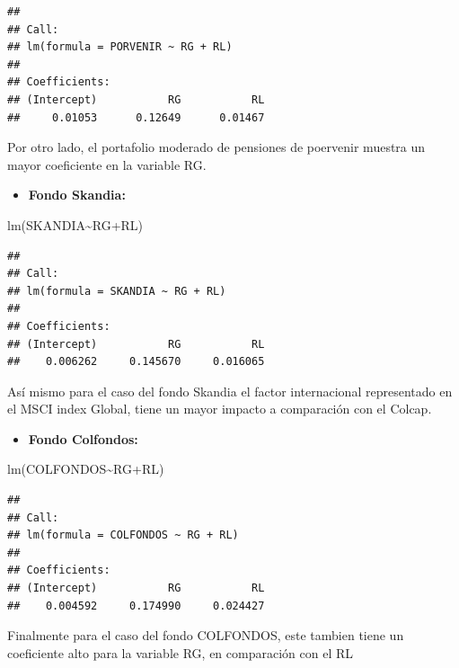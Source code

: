\documentclass[
  12pt,
]{article}
\newenvironment{Shaded}{\begin{snugshade}}{\end{snugshade}}
\newcommand{\FunctionTok}[1]{\textcolor[rgb]{0.00,0.00,0.00}{#1}}
\newcommand{\NormalTok}[1]{#1}
\newcommand{\SpecialCharTok}[1]{\textcolor[rgb]{0.00,0.00,0.00}{#1}}
\providecommand{\tightlist}{%
  \setlength{\itemsep}{0pt}\setlength{\parskip}{0pt}}
\begin{document}
\begin{verbatim}
## 
## Call:
## lm(formula = PORVENIR ~ RG + RL)
## 
## Coefficients:
## (Intercept)           RG           RL  
##     0.01053      0.12649      0.01467
\end{verbatim}

Por otro lado, el portafolio moderado de pensiones de poervenir muestra
un mayor coeficiente en la variable RG.

\begin{itemize}
\tightlist
\item
  \textbf{Fondo Skandia:}
\end{itemize}

\begin{Shaded}
\begin{Highlighting}[]
\FunctionTok{lm}\NormalTok{(SKANDIA}\SpecialCharTok{\textasciitilde{}}\NormalTok{RG}\SpecialCharTok{+}\NormalTok{RL)}
\end{Highlighting}
\end{Shaded}

\begin{verbatim}
## 
## Call:
## lm(formula = SKANDIA ~ RG + RL)
## 
## Coefficients:
## (Intercept)           RG           RL  
##    0.006262     0.145670     0.016065
\end{verbatim}

Así mismo para el caso del fondo Skandia el factor internacional
representado en el MSCI index Global, tiene un mayor impacto a
comparación con el Colcap.

\begin{itemize}
\tightlist
\item
  \textbf{Fondo Colfondos:}
\end{itemize}

\begin{Shaded}
\begin{Highlighting}[]
\FunctionTok{lm}\NormalTok{(COLFONDOS}\SpecialCharTok{\textasciitilde{}}\NormalTok{RG}\SpecialCharTok{+}\NormalTok{RL)}
\end{Highlighting}
\end{Shaded}

\begin{verbatim}
## 
## Call:
## lm(formula = COLFONDOS ~ RG + RL)
## 
## Coefficients:
## (Intercept)           RG           RL  
##    0.004592     0.174990     0.024427
\end{verbatim}

Finalmente para el caso del fondo COLFONDOS, este tambien tiene un
coeficiente alto para la variable RG, en comparación con el RL
\end{document}
